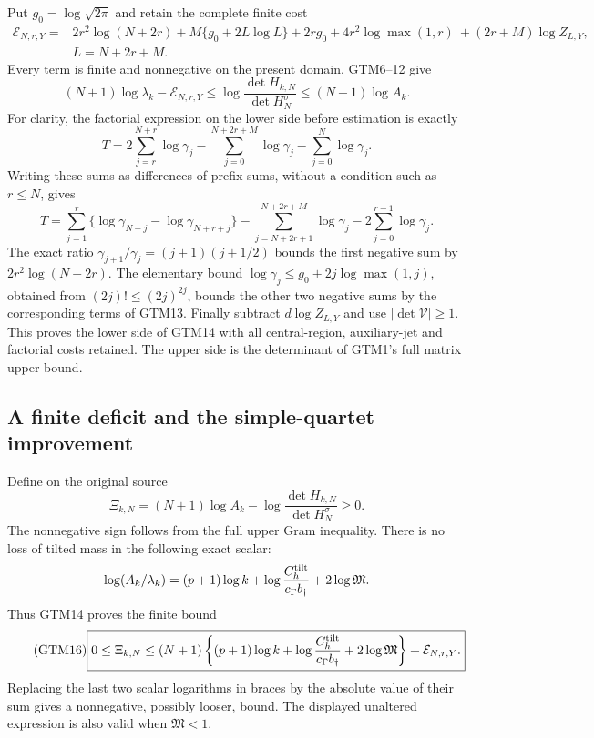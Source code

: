 \documentclass[11pt,a4paper]{article}
\begin{document}
Put $g_0=\log\sqrt{2\pi}$ and retain the complete finite cost
\begin{equation}\tag{GTM13}
 \begin{aligned}
 \mathcal E_{N,r,Y}={}&2r^2\log(N+2r)
 +M\{g_0+2L\log L\}+2rg_0
 +4r^2\log\max(1,r)\ + (2r+M)\log Z_{L,Y},\\
 & L=N+2r+M.
 \end{aligned}
\end{equation}
Every term is finite and nonnegative on the present domain.
GTM6--12 give
\begin{equation}\tag{GTM14}
 \boxed{(N+1)\log\lambda_k-\mathcal E_{N,r,Y}
 \le\log\frac{\det H_{k,N}}{\det H_N^\sigma}
 \le(N+1)\log A_k.}
\end{equation}
For clarity, the factorial expression on the lower side before
estimation is exactly
\[
 T=2\sum_{j=r}^{N+r}\log\gamma_j
 -\sum_{j=0}^{N+2r+M}\log\gamma_j-\sum_{j=0}^N\log\gamma_j.
\]
Writing these sums as differences of prefix sums, without a condition
such as $r\le N$, gives
\[
 T=\sum_{j=1}^r\{\log\gamma_{N+j}-\log\gamma_{N+r+j}\}
 -\sum_{j=N+2r+1}^{N+2r+M}\log\gamma_j
 -2\sum_{j=0}^{r-1}\log\gamma_j.
\]
The exact ratio $\gamma_{j+1}/\gamma_j=(j+1)(j+1/2)$ bounds
the first negative sum by $2r^2\log(N+2r)$.
The elementary bound
$\log\gamma_j\le g_0+2j\log\max(1,j)$, obtained from
$(2j)!\le(2j)^{2j}$, bounds the other two negative sums by
the corresponding terms of GTM13.  Finally subtract
$d\log Z_{L,Y}$ and use $|\det\mathcal V|\ge1$.
This proves the lower side of GTM14 with all central-region,
auxiliary-jet and factorial costs retained.  The upper side is
the determinant of GTM1's full matrix upper bound.

\subsection{A finite deficit and the simple-quartet improvement}

Define on the original source
\begin{equation}\tag{GTM15}
 \Xi_{k,N}=(N+1)\log A_k
       -\log\frac{\det H_{k,N}}{\det H_N^\sigma}\ge0.
\end{equation}
The nonnegative sign follows from the full upper Gram inequality.
There is no loss of tilted mass in the following exact scalar:
\[
 \log(A_k/\lambda_k)
 =(p+1)\log k+\log\frac{C_h^{\rm tilt}}{c_\Gamma b_\dagger}
                  +2\log\mathfrak M.
\]
Thus GTM14 proves the finite bound
\begin{equation}\tag{GTM16}
 \boxed{0\le\Xi_{k,N}\le
 (N+1)\left\{(p+1)\log k
       +\log\frac{C_h^{\rm tilt}}{c_\Gamma b_\dagger}
       +2\log\mathfrak M\right\}+\mathcal E_{N,r,Y}.}
\end{equation}
Replacing the last two scalar logarithms in braces by the absolute
value of their sum gives a nonnegative, possibly looser, bound.
The displayed unaltered expression is also valid when
$\mathfrak M<1$.
\end{document}
